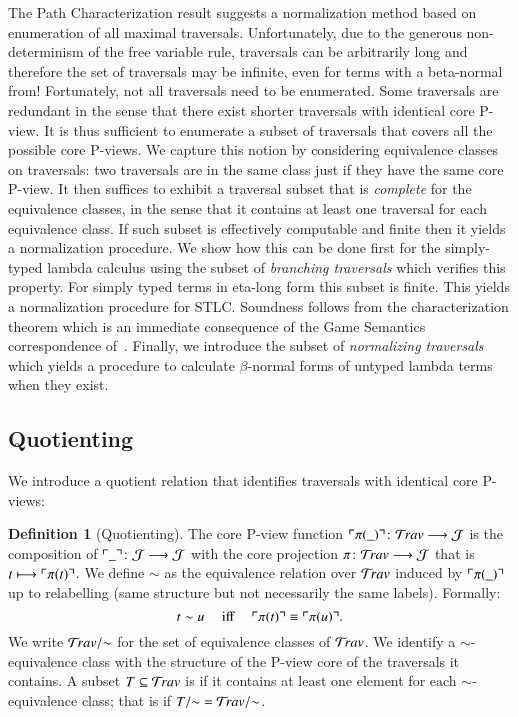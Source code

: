 \documentclass{elsarticle}
\theoremstyle{plain}
\theoremstyle{definition}
\newtheorem{definition}{Definition}[section]
\theoremstyle{remark}
\newcommand{\travulc}{\travset}
\def\coresymbol{\pi} %
\newcommand{\core}[1]{\coresymbol(#1)} %
\def\justseqset{\mathcal{J}}
\begin{document}
The Path Characterization result suggests a normalization method based on enumeration of all maximal traversals. Unfortunately, due to the generous non-determinism of the free variable rule, traversals can be arbitrarily long and therefore the set of traversals may be infinite, even for terms with a beta-normal from! Fortunately, not all traversals need to be enumerated. Some traversals are redundant in the sense that there exist shorter traversals with identical core P-view. It is thus sufficient to enumerate a subset of traversals that covers all the possible core P-views.
We capture this notion by considering equivalence classes on traversals: two traversals are in the same class just if they have the same core P-view. It then suffices to exhibit a traversal subset that is \emph{complete} for the equivalence classes, in the sense that it contains at least one traversal for each equivalence class. If such subset is effectively computable and finite then it yields a normalization procedure.
We show how this can be done first for the simply-typed lambda calculus using the subset of \emph{branching traversals} which verifies this property. For simply typed terms in eta-long form this subset is finite. This yields a normalization procedure for STLC. Soundness follows from the characterization theorem which is an immediate consequence of the Game Semantics correspondence of~\cite{BlumPhd}. Finally, we introduce the subset of \emph{normalizing traversals} which yields a  procedure to calculate $\beta$-normal forms of untyped lambda terms when they exist.

\subsection{Quotienting}

We introduce a quotient relation that identifies traversals with identical core P-views:
\begin{definition}[Quotienting]
The core P-view function
$\pview{\core{\_}} \colon \travulc \longrightarrow \justseqset $
is the composition of $\pview{\_}\colon \justseqset \longrightarrow \justseqset$ with the core projection $\coresymbol\colon\travulc  \longrightarrow \justseqset$ that is $t \longmapsto \pview{\core{t}}$.
We define $\sim$ as the equivalence relation over $\travulc$ induced by $\pview{\core{\_}}$ up to relabelling (same structure but not necessarily the same labels). Formally:
$$t \sim u \quad \mbox{ iff } \quad  \pview{\core{t}} \equiv \pview{\core{u}} .$$
We write $\travulc/{\sim}$ for the set of equivalence classes of $\travulc$. We identify a $\sim$-equivalence class with the structure of the P-view core of the traversals it contains. A subset $T\subseteq \travulc$ is  if it contains at least one element for each $\sim$-equivalence class; that is if $T/{\sim} = \travulc/{\sim}$.
\end{definition}
\end{document}
